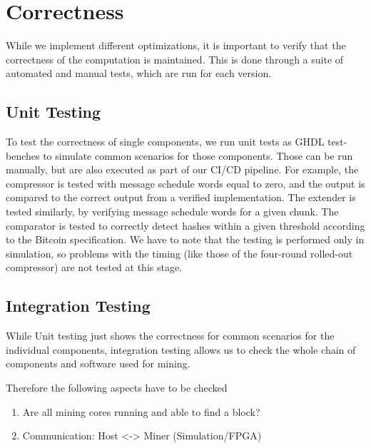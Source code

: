\section{Correctness}
While we implement different optimizations, it is important to verify that the correctness of the computation is maintained. This is done through a suite of automated and manual tests, which are run for each version.
\subsection{Unit Testing}

To test the correctness of single components, we run unit tests as GHDL test-benches to simulate common scenarios for those components. Those can be run manually, but are also executed as part of our CI/CD pipeline. For example, the compressor is tested with message schedule words equal to zero, and the output is compared to the correct output from a verified implementation. The extender is tested similarly, by verifying message schedule words for a given chunk. The comparator is tested to correctly detect hashes within a given threshold according to the Bitcoin specification. We have to note that the testing is performed only in simulation, so problems with the timing (like those of the four-round rolled-out compressor) are not tested at this stage.


\subsection{Integration Testing}

While Unit testing just shows the correctness for common scenarios for the individual components, integration testing allows us to check the whole chain of components and software used for mining.

Therefore the following aspects have to be checked

\begin{enumerate}
	\item Are all mining cores running and able to find a block?
	\item Communication: Host <-> Miner (Simulation/FPGA)
\end{enumerate}

